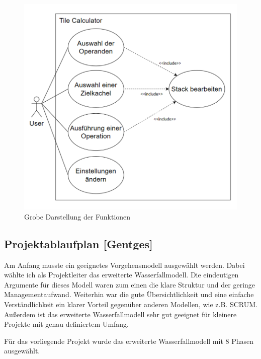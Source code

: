 \begin{figure}[h]
	\includegraphics[width=0.9\columnwidth]{img/funktionsumfang-grobe-darstellung-der-funktionen}
	\caption[Grobe Darstellung der Funktionen]{Grobe Darstellung der Funktionen\footnotemark}
\end{figure}

\subsection{Projektablaufplan [Gentges]}

Am Anfang musste ein geeignetes Vorgehensmodell ausgewählt werden. Dabei wählte ich als Projektleiter das erweiterte Wasserfallmodell. Die eindeutigen Argumente für dieses Modell waren zum einen die klare Struktur und der geringe Managementaufwand. Weiterhin war die gute Übersichtlichkeit und eine einfache Verständlichkeit ein klarer Vorteil gegenüber anderen Modellen, wie z.B. SCRUM. Außerdem ist das erweiterte Wasserfallmodell sehr gut geeignet für kleinere Projekte mit genau definiertem Umfang.

Für das vorliegende Projekt wurde das erweiterte Wasserfallmodell mit 8 Phasen ausgewählt. 

